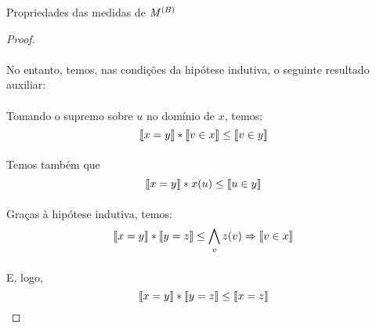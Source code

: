 \begin{proposition}{Propriedades das medidas de $\M{B}$}
\begin{proof}
            \paragraph{}
                No entanto, temos, nas condições da hipótese indutiva, o seguinte resultado auxiliar:
            \begin{prooftree}
            \end{prooftree}
            \paragraph{}
                Tomando o supremo sobre $u$ no domínio de $x$, temos:
            $$ \Meq{x}{y}*\Min{v}{x}\leq \Min{v}{y}$$
            \paragraph{}
                Temos também que
            $$\Meq{x}{y} * x(u) \leq \Min{u}{y}$$
            \begin{prooftree}
            \end{prooftree}
            \paragraph{}
                Graças à hipótese indutiva, temos:
            $$\Meq{x}{y}*\Meq{y}{z} \leq\bigwedge_v z(v)\RAR \Min{v}{x}$$
            \paragraph{}
                E, logo, 
            $$\Meq{x}{y}*\Meq{y}{z}\leq \Meq{x}{z}$$\eop
        \end{proof}
    \end{proposition}
